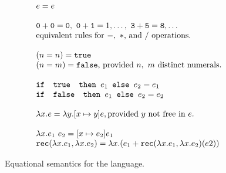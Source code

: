 \begin{figure}
\[
\begin{array}{lr}
e = e \\ \\
\texttt{0} + \texttt{0} = \texttt{0}, \ \texttt{0} + \texttt{1} = 1, \ldots, \ \texttt{3} + \texttt{5} = \texttt{8}, \ldots  \\
\text{equivalent rules for } -, \ * \text{, and } /\text{ operations.}
\\ \\
(n =n) = \texttt{true} \\ (n=m) = \texttt{false}\text{, provided } n, \ m \text{ distinct numerals.}\\ \\ 
\ifelse{\texttt{ true }}{e_1}{e_2} = e_1 \\
\ifelse{\texttt{ false }}{e_1}{e_2} = e_2 \\ \\ 
\lambda x.e = \lambda y.[x \mapsto y]e, \text{provided } y \text{ not free in } e. \\ \\ 
\lambda x.e_1 \ e_2 = [x \mapsto e_2]e_1 \\
\texttt{rec}(\lambda x.e_1, \lambda x.e_2) = 
			\lambda x.(e_1 + \texttt{rec}(\lambda x.e_1, \lambda x.e_2)(e2)) \\
\end{array}
\]
\caption{Equational semantics for the language.}
\label{fig:eqsem}
\end{figure}

